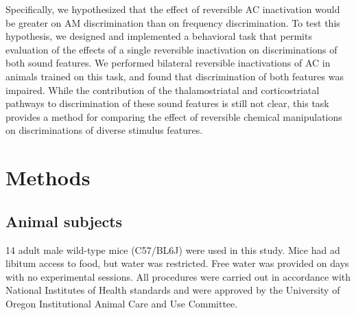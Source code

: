 Specifically, we hypothesized that the effect of reversible AC inactivation
would be greater on AM discrimination than on frequency discrimination. 
%
To test this hypothesis, we designed and implemented a behavioral task that
permits evaluation of the effects of a single reversible inactivation on
discriminations of both sound features.
%
We performed bilateral reversible inactivations of AC in animals trained on
this task, and found that discrimination of both features was impaired. 
%
While the contribution of the thalamostriatal and corticostriatal pathways to
discrimination of these sound features is still not clear, this task provides a
method for comparing the effect of reversible chemical manipulations on
discriminations of diverse stimulus features. 


\section{Methods}

\subsection{Animal subjects}
14 adult male wild-type mice (C57/BL6J) were used in this study. Mice had ad
libitum access to food, but water was restricted. Free water was provided on
days with no experimental sessions. All procedures were carried out in
accordance with National Institutes of Health standards and were approved by
the University of Oregon Institutional Animal Care and Use Committee.

